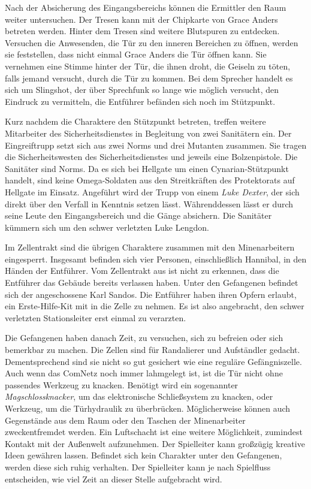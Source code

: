 
Nach der Absicherung des Eingangsbereichs können die Ermittler den Raum weiter untersuchen. Der Tresen kann mit der Chipkarte von Grace Anders betreten werden. Hinter dem Tresen sind weitere Blutspuren zu entdecken. Versuchen die Anwesenden, die Tür zu den inneren Bereichen zu öffnen, werden sie feststellen, dass nicht einmal Grace Anders die Tür öffnen kann. Sie vernehmen eine Stimme hinter der Tür, die ihnen droht, die Geiseln zu töten, falls jemand versucht, durch die Tür zu kommen. Bei dem Sprecher handelt es sich um Slingshot, der über Sprechfunk so lange wie möglich versucht, den Eindruck zu vermitteln, die Entführer befänden sich noch im Stützpunkt.

Kurz nachdem die Charaktere den Stützpunkt betreten, treffen weitere Mitarbeiter des Sicherheitsdienstes in Begleitung von zwei Sanitätern ein. Der Eingreiftrupp setzt sich aus zwei Norms und drei Mutanten zusammen. Sie tragen die Sicherheitswesten des Sicherheitsdienstes und jeweils eine Bolzenpistole. Die Sanitäter sind Norms. Da es sich bei Hellgate um einen Cynarian-Stützpunkt handelt, sind keine Omega-Soldaten aus den Streitkräften des Protektorats auf Hellgate im Einsatz. Angeführt wird der Trupp von einem \emph{Luke Dexter}, der sich direkt über den Verfall in Kenntnis setzen lässt. Währenddessen lässt er durch seine Leute den Eingangsbereich und die Gänge absichern. Die Sanitäter kümmern sich um den schwer verletzten Luke Lengdon.


Im Zellentrakt sind die übrigen Charaktere zusammen mit den Minenarbeitern eingesperrt. Insgesamt befinden sich vier Personen, einschließlich Hannibal, in den Händen der Entführer. Vom Zellentrakt aus ist nicht zu erkennen, dass die Entführer das Gebäude bereits verlassen haben. Unter den Gefangenen befindet sich der angeschossene Karl Sandos. Die Entführer haben ihren Opfern erlaubt, ein Erste-Hilfe-Kit mit in die Zelle zu nehmen. Es ist also angebracht, den schwer verletzten Stationsleiter erst einmal zu verarzten. 

Die Gefangenen haben danach Zeit, zu versuchen, sich zu befreien oder sich bemerkbar zu machen. Die Zellen sind für Randalierer und Aufständler gedacht. Dementsprechend sind sie nicht so gut gesichert wie eine reguläre Gefängniszelle. Auch wenn das ComNetz noch immer lahmgelegt ist, ist die Tür nicht ohne passendes Werkzeug zu knacken. Benötigt wird ein sogenannter \emph{Magschlossknacker}, um das elektronische Schließsystem zu knacken, oder Werkzeug, um die Türhydraulik zu überbrücken. Möglicherweise können auch Gegenstände aus dem Raum oder den Taschen der Minenarbeiter zweckentfremdet werden. Ein Luftschacht ist eine weitere Möglichkeit, zumindest Kontakt mit der Außenwelt aufzunehmen. Der Spielleiter kann großzügig kreative Ideen gewähren lassen. Befindet sich kein Charakter unter den Gefangenen, werden diese sich ruhig verhalten. Der Spielleiter kann je nach Spielfluss entscheiden, wie viel Zeit an dieser Stelle aufgebracht wird.

